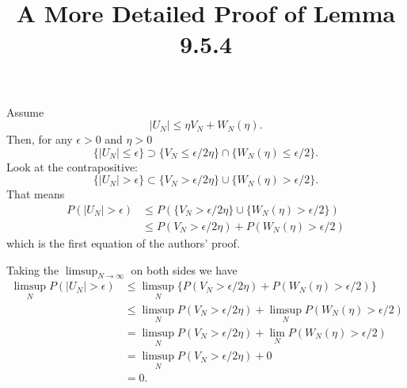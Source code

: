 \documentclass{article}
\title{A More Detailed Proof of Lemma 9.5.4}
\begin{document}
\maketitle

Assume
$$
|U_N| \le \eta V_N + W_N(\eta).
$$
Then, for any $\epsilon > 0$ and $\eta > 0$
\[
\{ |U_N| \le \epsilon \} \supset \{ V_N \le \epsilon/2\eta \}  \cap \{ W_N(\eta) \le \epsilon/2\}.
\]
Look at the contrapositive:
\[
\{ |U_N| > \epsilon \} \subset \{ V_N > \epsilon/2\eta \}  \cup \{ W_N(\eta) > \epsilon/2\}.
\]
That means
\begin{align*}
P(|U_N| > \epsilon) &\le P(\{ V_N > \epsilon/2\eta \}  \cup \{ W_N(\eta) > \epsilon/2\}) \\
&\le P( V_N > \epsilon/2\eta ) + P( W_N(\eta) > \epsilon/2) \tag{sub-additivity}
\end{align*}
which is the first equation of the authors' proof. 
\newline


Taking the $\limsup_{N \to \infty}$ on both sides we have
\begin{align*}
\limsup_N P(|U_N| > \epsilon) &\le \limsup_N \{ P( V_N > \epsilon/2\eta ) + P( W_N(\eta) > \epsilon/2) \}\\
&\le \limsup_N P(V_N >\epsilon/2\eta) + \limsup_N P( W_N(\eta) >\epsilon/2 ) \tag{properties of sup} \\
&= \limsup_N P(V_N > \epsilon/2\eta) + \lim_N P( W_N(\eta) > \epsilon/2 ) \tag{assumption}\\
&= \limsup_N P(V_N > \epsilon/2\eta) + 0 \tag{assumption}\\
&= 0.
\end{align*}
\end{document}
